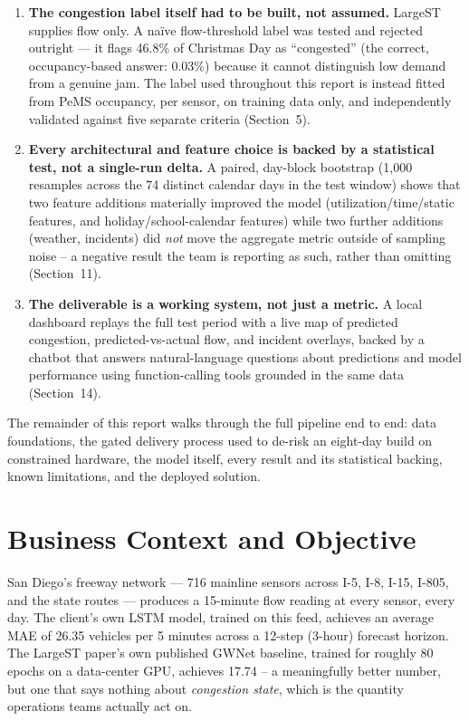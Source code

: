\documentclass[11pt]{article}
\begin{document}
\begin{enumerate}
\item \textbf{The congestion label itself had to be built, not assumed.} LargeST supplies flow
  only. A na\"ive flow-threshold label was tested and rejected outright --- it flags 46.8\% of
  Christmas Day as ``congested'' (the correct, occupancy-based answer: 0.03\%) because it cannot
  distinguish low demand from a genuine jam. The label used throughout this report is instead
  fitted from PeMS occupancy, per sensor, on training data only, and independently validated
  against five separate criteria (Section~5).
\item \textbf{Every architectural and feature choice is backed by a statistical test, not a
  single-run delta.} A paired, day-block bootstrap (1{,}000 resamples across the 74 distinct
  calendar days in the test window) shows that two feature additions materially improved the
  model (utilization/time/static features, and holiday/school-calendar features) while two
  further additions (weather, incidents) did \emph{not} move the aggregate metric outside of
  sampling noise -- a negative result the team is reporting as such, rather than omitting
  (Section~11).
\item \textbf{The deliverable is a working system, not just a metric.} A local dashboard replays
  the full test period with a live map of predicted congestion, predicted-vs-actual flow, and
  incident overlays, backed by a chatbot that answers natural-language questions about
  predictions and model performance using function-calling tools grounded in the same data
  (Section~14).
\end{enumerate}

The remainder of this report walks through the full pipeline end to end: data foundations,
the gated delivery process used to de-risk an eight-day build on constrained hardware, the model
itself, every result and its statistical backing, known limitations, and the deployed solution.

\section{Business Context and Objective}

San Diego's freeway network --- 716 mainline sensors across I-5, I-8, I-15, I-805, and the
state routes --- produces a 15-minute flow reading at every sensor, every day. The client's own
LSTM model, trained on this feed, achieves an average MAE of 26.35 vehicles per 5 minutes across
a 12-step (3-hour) forecast horizon. The LargeST paper's own published GWNet baseline, trained
for roughly 80 epochs on a data-center GPU, achieves 17.74 -- a meaningfully better number, but
one that says nothing about \emph{congestion state}, which is the quantity operations teams
actually act on.
\end{document}

